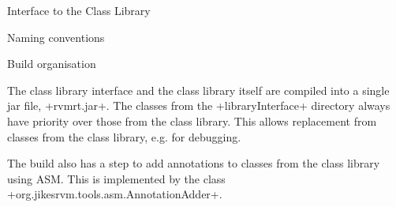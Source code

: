 \begin{chapter}{Interface to the Class Library}
\begin{section}{Naming conventions}
\end{section}

\begin{section}{Build organisation}

The class library interface and the class library itself are compiled into a single jar file, \spverb+rvmrt.jar+. The classes from the \spverb+libraryInterface+ directory always have priority over those from the class library. This allows replacement from classes from the class library, e.g. for debugging.

The build also has a step to add annotations to classes from the class library using ASM. This is implemented by the class \spverb+org.jikesrvm.tools.asm.AnnotationAdder+.

\end{section}


\end{chapter}
